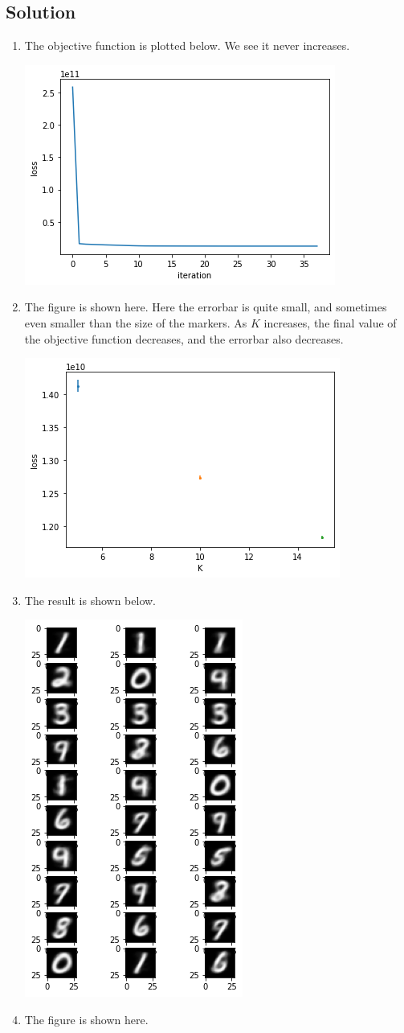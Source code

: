 \documentclass[submit]{harvardml}
\begin{document}
\subsection*{Solution}
\begin{enumerate}
    \item 
    The objective function is plotted below. We see it never increases.
    \begin{center}
    \includegraphics[width=.5\textwidth]{P2_a.png}
    \end{center}
    \item
    The figure is shown here. Here the errorbar is quite small, and sometimes even smaller than the size of the markers.
    As $K$ increases, the final value of the objective function decreases, and the errorbar also decreases.
    \begin{center}
    \includegraphics[width=.5\textwidth]{P2_b.png}
    \end{center}
    \item
    The result is shown below.
    \begin{center}
    \includegraphics[width=.5\textwidth]{P2_c_1.png}
    \end{center}
    \item
    The figure is shown here.


\end{enumerate}
\end{document}
